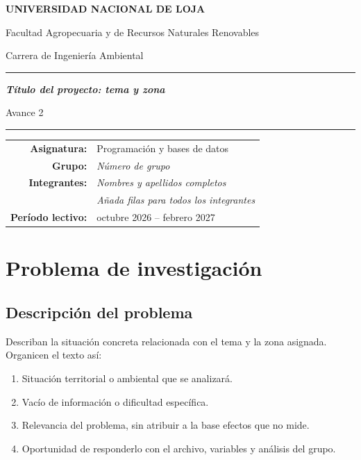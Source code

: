 \documentclass[11pt,a4paper]{article}
\newcommand{\completar}[1]{\textit{\textcolor{gris}{#1}}}
\begin{document}
\hypersetup{pageanchor=false}

\begin{titlepage}
\centering
\vspace*{2.0cm}
{\Large\bfseries UNIVERSIDAD NACIONAL DE LOJA\par}
\vspace{0.3cm}
{\large Facultad Agropecuaria y de Recursos Naturales Renovables\par}
{\large Carrera de Ingeniería Ambiental\par}
\vspace{1.3cm}
{\color{verde}\rule{0.82\linewidth}{1.3pt}\par}
\vspace{0.55cm}
{\huge\bfseries \completar{Título del proyecto: tema y zona}\par}
\vspace{0.45cm}
{\Large Avance 2\par}
\vspace{0.55cm}
{\color{verde}\rule{0.82\linewidth}{1.3pt}\par}
\vfill
\begin{tabular}{rl}
\textbf{Asignatura:} & Programación y bases de datos\\
\textbf{Grupo:} & \completar{Número de grupo}\\
\textbf{Integrantes:} & \completar{Nombres y apellidos completos}\\
 & \completar{Añada filas para todos los integrantes}\\
\textbf{Período lectivo:} & octubre 2026 -- febrero 2027\\
\end{tabular}
\vspace{1cm}
\end{titlepage}
\hypersetup{pageanchor=true}

\section{Problema de investigación}
\subsection{Descripción del problema}
Describan la situación concreta relacionada con el tema y la zona asignada. Organicen el texto así:
\begin{enumerate}
  \item Situación territorial o ambiental que se analizará.
  \item Vacío de información o dificultad específica.
  \item Relevancia del problema, sin atribuir a la base efectos que no mide.
  \item Oportunidad de responderlo con el archivo, variables y análisis del grupo.
\end{enumerate}
\end{document}

